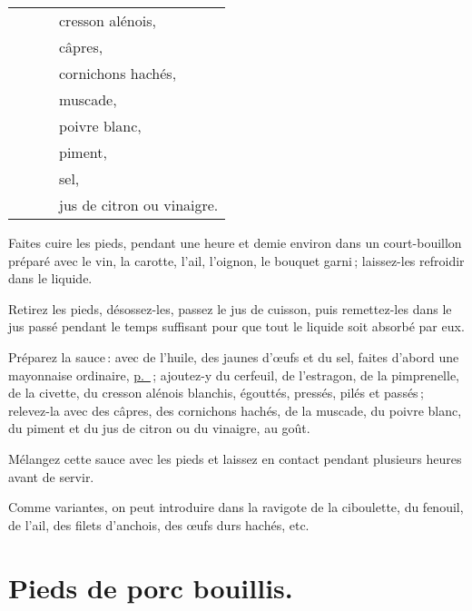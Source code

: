 \begin{longtable}{rrrp{18em}}
        &           &    & cresson alénois,                                                               \\
        &           &    & câpres,                                                                        \\
        &           &    & cornichons hachés,                                                             \\
        &           &    & muscade,                                                                       \\
        &           &    & poivre blanc,                                                                  \\
        &           &    & piment,                                                                        \\
        &           &    & sel,                                                                           \\
        &           &    & jus de citron ou vinaigre.                                                     \\
\end{longtable}
\normalsize

Faites cuire les pieds, pendant une heure et demie environ dans un
court-bouillon préparé avec le vin, la carotte, l'ail, l'oignon, le bouquet
garni ; laissez-les refroidir dans le liquide.

Retirez les pieds, désossez-les, passez le jus de cuisson, puis remettez-les
dans le jus passé pendant le temps suffisant pour que tout le liquide soit
absorbé par eux.

Préparez la sauce : avec de l'huile, des jaunes d'œufs et du sel, faites
d'abord une mayonnaise ordinaire, \hyperlink{p0323-2}{p. \pageref{pg0323-2}} ;
ajoutez-y du cerfeuil, de l'estragon, de la pimprenelle, de la civette, du
cresson alénois blanchis, égouttés, pressés, pilés et passés ; relevez-la avec
des câpres, des cornichons hachés, de la muscade, du poivre blanc, du piment et
du jus de citron ou du vinaigre, au goût.

Mélangez cette sauce avec les pieds et laissez en contact pendant plusieurs
heures avant de servir.

\sk

Comme variantes, on peut introduire dans la ravigote de la ciboulette, du
fenouil, de l'ail, des filets d'anchois, des œufs durs hachés, etc.

\section*{\centering Pieds de porc bouillis.}
{}

